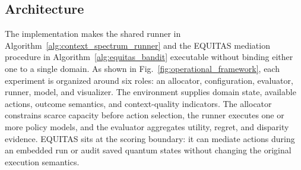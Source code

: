 \documentclass[conference]{IEEEtran}
\begin{document}
\subsection{Architecture}
The implementation makes the shared runner in Algorithm~\ref{alg:context_spectrum_runner}
and the EQUITAS mediation procedure in Algorithm~\ref{alg:equitas_bandit}
executable without binding either one to a single domain. As shown in
Fig.~\ref{fig:operational_framework}, each experiment is organized around six
roles: an allocator, configuration, evaluator, runner, model, and visualizer.
The environment supplies domain state, available actions, outcome semantics,
and context-quality indicators. The allocator constrains scarce capacity before
action selection, the runner executes one or more policy models, and the
evaluator aggregates utility, regret, and disparity evidence. EQUITAS sits at
the scoring boundary: it can mediate actions during an embedded run or audit
saved quantum states without changing the original execution semantics.
\end{document}
